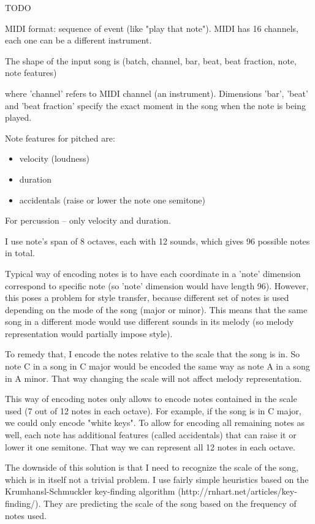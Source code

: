 \documentclass[en]{pracamgr}
\begin{document}
TODO

MIDI format: sequence of event (like "play that note").
MIDI has 16 channels, each one can be a different instrument.

The shape of the input song is (batch, channel, bar, beat, beat fraction, note, note features)

where 'channel' refers to MIDI channel (an instrument).
Dimensions 'bar', 'beat' and 'beat fraction' specify the exact moment in the song when the note is being played.

Note features for pitched are:
\begin{itemize}
\item velocity (loudness)
\item duration
\item accidentals (raise or lower the note one semitone)
\end{itemize}
For percussion -- only velocity and duration.

I use note's span of 8 octaves, each with 12 sounds, which gives 96 possible notes in total.

Typical way of encoding notes is to have each coordinate in a 'note' dimension correspond to specific note (so 'note' dimension would have length 96).
However, this poses a problem for style transfer, because different set of notes is used depending on the mode of the song (major or minor).
This means that the same song in a different mode would use different sounds in its melody (so melody representation would partially impose style).

To remedy that, I encode the notes relative to the scale that the song is in.
So note C in a song in C major would be encoded the same way as note A in a song in A minor.
That way changing the scale will not affect melody representation.

This way of encoding notes only allows to encode notes contained in the scale used (7 out of 12 notes in each octave).
For example, if the song is in C major, we could only encode "white keys".
To allow for encoding all remaining notes as well, each note has additional features (called accidentals) that can raise it or lower it one semitone.
That way we can represent all 12 notes in each octave.

The downside of this solution is that I need to recognize the scale of the song, which is in itself not a trivial problem.
I use fairly simple heuristics based on the Krumhansl-Schmuckler key-finding algorithm (http://rnhart.net/articles/key-finding/).
They are predicting the scale of the song based on the frequency of notes used.
\end{document}
